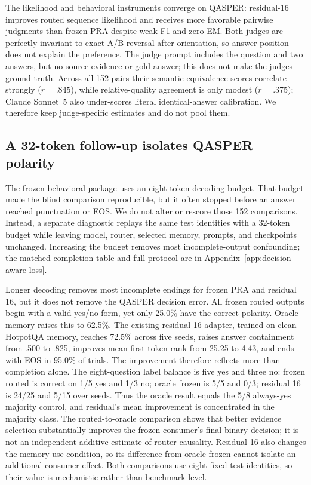 \documentclass[11pt]{article}
\begin{document}
The likelihood and behavioral instruments converge on QASPER: residual-16 improves routed
sequence likelihood and receives more favorable pairwise judgments than frozen PRA despite weak F1
and zero EM. Both judges are perfectly invariant to exact A/B reversal after orientation, so answer
position does not explain the preference. The judge prompt includes the question and two answers,
but no source evidence or gold answer; this does not make the judges ground truth. Across all
152 pairs their semantic-equivalence scores correlate strongly ($r=.845$), while relative-quality
agreement is only modest ($r=.375$); Claude Sonnet~5 also under-scores literal identical-answer
calibration. We therefore keep judge-specific estimates and do not pool them.

\subsection{A 32-token follow-up isolates QASPER polarity}
\label{sec:qasper-completion-diagnostic}

The frozen behavioral package uses an eight-token decoding budget. That budget made the blind
comparison reproducible, but it often stopped before an answer reached punctuation or EOS. We do
not alter or rescore those 152 comparisons. Instead, a separate diagnostic replays the same test
identities with a 32-token budget while leaving model, router, selected memory, prompts, and
checkpoints unchanged. Increasing the budget removes most incomplete-output confounding; the
matched completion table and full protocol are in Appendix~\ref{app:decision-aware-loss}.

Longer decoding removes most incomplete endings for frozen PRA and residual 16, but it does not
remove the QASPER decision error. All frozen routed outputs begin with a valid yes/no form, yet
only 25.0\% have the correct polarity. Oracle memory raises this to 62.5\%. The existing
residual-16 adapter, trained on clean HotpotQA memory, reaches 72.5\% across five seeds, raises
answer containment from .500 to .825, improves mean first-token rank from 25.25 to 4.43, and ends
with EOS in 95.0\% of trials. The improvement therefore reflects more than completion alone.
The eight-question label balance is five yes and three no: frozen routed is correct on 1/5 yes and
1/3 no; oracle frozen is 5/5 and 0/3; residual 16 is 24/25 and 5/15 over seeds. Thus the oracle
result equals the 5/8 always-yes majority control, and residual's mean improvement is concentrated
in the majority class.
The routed-to-oracle comparison shows that better evidence selection substantially improves the
frozen consumer's final binary decision; it is not an independent additive estimate of router
causality. Residual 16 also changes the memory-use condition, so its difference from oracle-frozen
cannot isolate an additional consumer effect. Both comparisons use eight fixed
test identities, so their value is mechanistic rather than benchmark-level.
\end{document}
